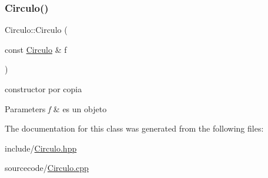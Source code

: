 \subsubsection{\texorpdfstring{Circulo()}{Circulo()}\hspace{0.1cm}{\footnotesize\ttfamily [2/2]}}
{\footnotesize\ttfamily Circulo\+::\+Circulo (\begin{DoxyParamCaption}\item[{const \hyperlink{class_circulo}{Circulo} \&}]{f }\end{DoxyParamCaption})}



constructor por copia 


\begin{DoxyParams}{Parameters}
{\em f} & es un objeto \\
\hline
\end{DoxyParams}


The documentation for this class was generated from the following files\+:\begin{DoxyCompactItemize}
\item 
include/\hyperlink{_circulo_8hpp}{Circulo.\+hpp}\item 
sourcecode/\hyperlink{_circulo_8cpp}{Circulo.\+cpp}\end{DoxyCompactItemize}
